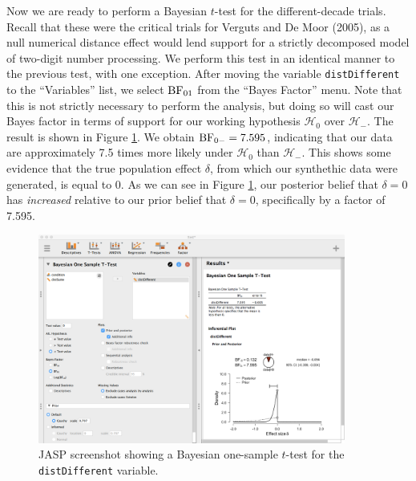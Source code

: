 \documentclass[english,,doc,floatsintext]{apa6}
\begin{document}
Now we are ready to perform a Bayesian \(t\)-test for the different-decade trials. Recall that these were the critical trials for Verguts and De Moor (2005), as a null numerical distance effect would lend support for a strictly decomposed model of two-digit number processing. We perform this test in an identical manner to the previous test, with one exception. After moving the variable \texttt{distDifferent} to the \enquote{Variables} list, we select \(\textnormal{BF}_{01}\) from the \enquote{Bayes Factor} menu. Note that this is not strictly necessary to perform the analysis, but doing so will cast our Bayes factor in terms of support for our working hypothesis \(\mathcal{H}_{0}\) over \(\mathcal{H}_{-}\). The result is shown in Figure \ref{fig:ttestBayes2}. We obtain \(\textnormal{BF}_{0-}=7.595\), indicating that our data are approximately 7.5 times more likely under \(\mathcal{H}_{0}\) than \(\mathcal{H}_{-}\). This shows some evidence that the true population effect \(\delta\), from which our synthethic data were generated, is equal to 0. As we can see in Figure \ref{fig:ttestBayes2}, our posterior belief that \(\delta=0\) has \emph{increased} relative to our prior belief that \(\delta=0\), specifically by a factor of 7.595.

\begin{figure}
\centering
\includegraphics[width=0.9\textwidth,height=\textheight]{figures/ttestBayes2.png}
\caption{\label{fig:ttestBayes2}JASP screenshot showing a Bayesian one-sample \(t\)-test for the \texttt{distDifferent} variable.}
\end{figure}
\end{document}
